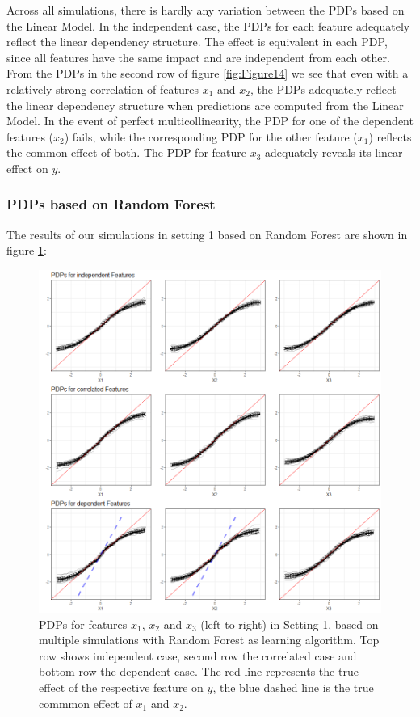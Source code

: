 \documentclass[]{krantz}
\begin{document}
Across all simulations, there is hardly any variation between the PDPs
based on the Linear Model. In the independent case, the PDPs for each
feature adequately reflect the linear dependency structure. The effect
is equivalent in each PDP, since all features have the same impact and
are independent from each other. From the PDPs in the second row of
figure \ref{fig:Figure14} we see that even with a relatively strong
correlation of features \(x_1\) and \(x_2\), the PDPs adequately reflect
the linear dependency structure when predictions are computed from the
Linear Model. In the event of perfect multicollinearity, the PDP for one
of the dependent features (\(x_2\)) fails, while the corresponding PDP
for the other feature (\(x_1\)) reflects the common effect of both. The
PDP for feature \(x_3\) adequately reveals its linear effect on \(y\).

\subsubsection{PDPs based on Random
Forest}\label{pdps-based-on-random-forest}

The results of our simulations in setting 1 based on Random Forest are
shown in figure \ref{fig:Figure15}:

\begin{figure}

\includegraphics[width=1\linewidth]{images/VK_PDP_15_Set1_RF} \hfill{}

\caption{PDPs for features $x_1$, $x_2$ and $x_3$ (left to right) in Setting 1, based on multiple simulations with Random Forest as learning algorithm. Top row shows independent case, second row the correlated case and bottom row the dependent case. The red line represents the true effect of the respective feature on $y$, the blue dashed line is the true commmon effect of $x_1$ and $x_2$.}\label{fig:Figure15}
\end{figure}
\end{document}
